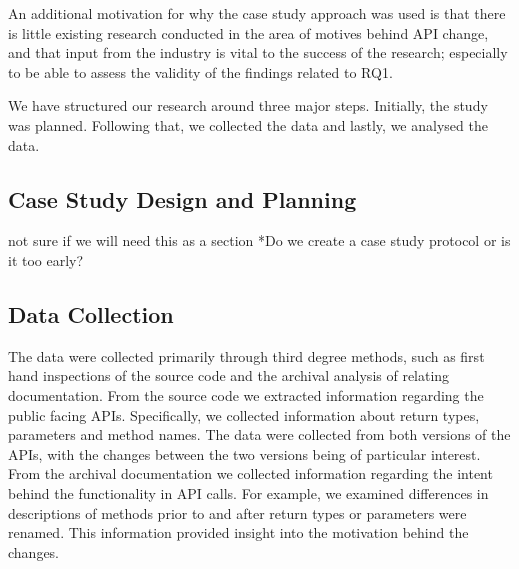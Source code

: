 \documentclass[10pt,twocolumn]{article}
\begin{document}
An additional motivation for why the case study approach was used is that there is little existing research conducted in the area of motives behind API change, and that input from the industry is vital to the success of the research; especially to be able to assess the validity of the findings related to RQ1. 

We have structured our research around three major steps. Initially, the study was planned. Following that, we collected the data and lastly, we analysed the data. 

\subsection{Case Study Design and Planning}

not sure if we will need this as a section
*Do we create a case study protocol or is it too early?






\subsection{Data Collection}





The data were collected primarily through third degree methods, such as first hand inspections of the source code and the archival analysis of relating documentation. From the source code we extracted information regarding the public facing APIs. Specifically, we collected information about return types, parameters and method names. The data were collected from both versions of the APIs, with the changes between the two versions being of particular interest. From the archival documentation we collected information regarding the intent behind the functionality in API calls. For example, we examined differences in descriptions of methods prior to and after return types or parameters were renamed. This information provided insight into the motivation behind the changes.
\end{document}
